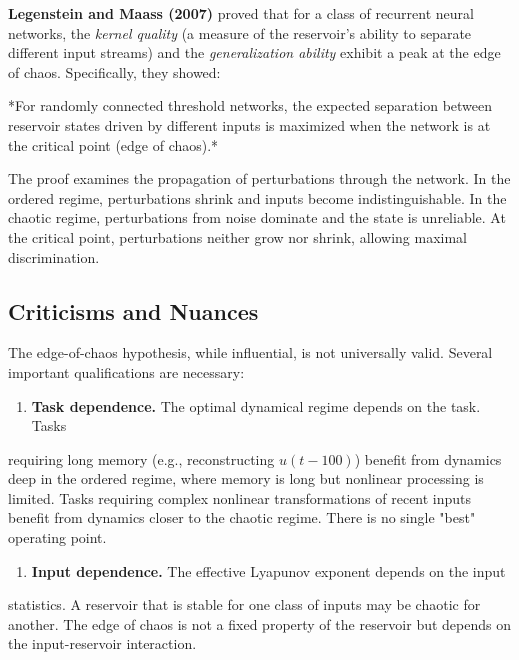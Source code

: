 \textbf{Legenstein and Maass (2007)} proved that for a class of recurrent neural networks,
the \textit{kernel quality} (a measure of the reservoir's ability to separate different input
streams) and the \textit{generalization ability} exhibit a peak at the edge of chaos.
Specifically, they showed:

\begin{theorem}\label{thm:15.21}
*For randomly connected
threshold networks, the expected separation between reservoir states driven by
different inputs is maximized when the network is at the critical point (edge of chaos).*

The proof examines the propagation of perturbations through the network. In the
ordered regime, perturbations shrink and inputs become indistinguishable. In the
chaotic regime, perturbations from noise dominate and the state is unreliable. At
the critical point, perturbations neither grow nor shrink, allowing maximal
discrimination.
\end{theorem}


\subsection{Criticisms and Nuances}\label{sec:15.7.4}

The edge-of-chaos hypothesis, while influential, is not universally valid. Several
important qualifications are necessary:

\begin{enumerate}[nosep]
  \item \textbf{Task dependence.} The optimal dynamical regime depends on the task. Tasks
\end{enumerate}
   requiring long memory (e.g., reconstructing $u(t-100)$) benefit from dynamics
   deep in the ordered regime, where memory is long but nonlinear processing is
   limited. Tasks requiring complex nonlinear transformations of recent inputs
   benefit from dynamics closer to the chaotic regime. There is no single "best"
   operating point.

\begin{enumerate}[nosep]
  \item \textbf{Input dependence.} The effective Lyapunov exponent depends on the input
\end{enumerate}
   statistics. A reservoir that is stable for one class of inputs may be chaotic
   for another. The edge of chaos is not a fixed property of the reservoir but
   depends on the input-reservoir interaction.

